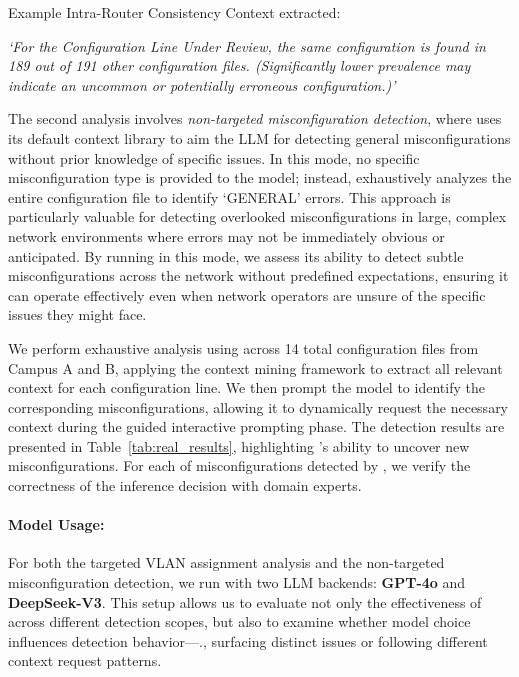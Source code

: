 Example Intra-Router Consistency Context extracted:

\textit{`For the Configuration Line Under Review, the same configuration is found in 189 out of 191 other configuration files. (Significantly lower prevalence may indicate an uncommon or potentially erroneous configuration.)'}

The second analysis involves \textit{non-targeted misconfiguration detection}, where \sysname{} uses its default context library to aim the LLM for detecting general misconfigurations without prior knowledge of specific issues. In this mode, no specific misconfiguration type is provided to the model; instead, \sysname{} exhaustively analyzes the entire configuration file to identify `GENERAL' errors. 
This approach is particularly valuable for detecting overlooked misconfigurations in large, complex network environments where errors may not be immediately obvious or anticipated. By running \sysname{} in this mode, we assess its ability to detect subtle misconfigurations across the network without predefined expectations, ensuring it can operate effectively even when network operators are unsure of the specific issues they might face.

We perform exhaustive analysis using \sysname{} across 14 total configuration files from Campus A and B, applying the context mining framework to extract all relevant context for each configuration line. We then prompt the model to identify the corresponding misconfigurations, allowing it to dynamically request the necessary context during the guided interactive prompting phase. The detection results are presented in Table~\ref{tab:real_results}, highlighting \sysname{}'s ability to uncover new misconfigurations.   For each of misconfigurations detected by \sysname{}, we verify the correctness of the inference decision with domain experts. 

\paragraph{Model Usage:} For both the targeted VLAN assignment analysis and the non-targeted misconfiguration detection, we run \sysname{} with two LLM backends: \textbf{GPT-4o} and \textbf{DeepSeek-V3}. This setup allows us to evaluate not only the effectiveness of \sysname{} across different detection scopes, but also to examine whether model choice influences detection behavior—\eg., surfacing distinct issues or following different context request patterns.

